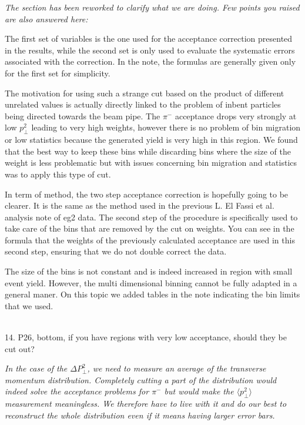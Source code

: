 \documentclass[12pt]{article}
\begin{document}
{ \it The section has been reworked to clarify what we are doing. Few points you raised 
are also answered here:

The first set of variables is the one used for the acceptance correction presented in the results,
while the second set is only used to evaluate the systematic errors associated with the correction. In the 
note, the formulas are generally given only for the first set for simplicity.

The motivation for using such a strange cut based on the product of different unrelated
values is actually directly linked to the problem of inbent 
particles being directed towards the beam pipe. The $\pi^-$ acceptance drops very 
strongly at low $p_\perp^2$ leading to very high weights, however there is no problem of 
bin migration
or low statistics because the generated yield is very high in this region. We found that 
the best way
to keep these bins while discarding bins where the size of the weight is less problematic 
but with issues concerning bin migration and statistics was to apply this type of cut.

In term of method, the two
step acceptance correction is hopefully going to be clearer. It is the same as the method used 
in the previous L. El Fassi et al. analysis note of eg2 data. The second step of the procedure is
specifically used to take care of the bins that are removed by the cut on weights. You 
can see in the formula that the weights
of the previously calculated acceptance are used in this second step, ensuring that we do not
double correct the data.

The size of the bins is not constant and is indeed increased in region with small event yield.
However, the multi dimensional binning cannot be fully adapted in a general maner. On this
topic we added tables in the note indicating the bin limits that we used.} \\

14.
P26, bottom, if you have regions with very low acceptance, should they be cut out?

{\it In the case of the $\Delta P_\perp^2$, we need to measure an average of the
transverse momentum distribution. Completely cutting a part of the distribution
would indeed solve the acceptance problems for $\pi^-$ but would make the $\langle p_\perp^2 \rangle$
measurement meaningless. We therefore have to live with it and do our best to
reconstruct the whole distribution even if it means having larger error bars.} \\
\end{document}

